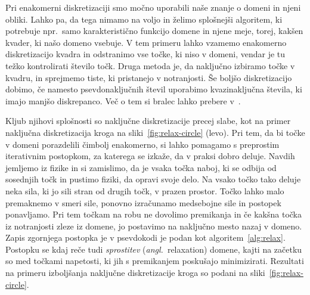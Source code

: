 \documentclass[12pt,a4paper]{article}
\theoremstyle{definition} %
\theoremstyle{plain} %
\numberwithin{equation}{section}
\newcommand{\ang}[1]{(\textit{angl.}\ #1)}
\begin{document}
Pri enakomerni diskretizaciji smo močno uporabili naše znanje o domeni in njeni
obliki. Lahko pa, da tega nimamo na voljo in želimo splošnejši algoritem, ki
potrebuje npr.~samo karakteristično funkcijo domene in njene meje, torej, kakšen
kvader, ki našo domeno vsebuje.
V tem primeru lahko vzamemo enakomerno diskretizacijo kvadra in odstranimo vse
točke, ki niso v domeni, vendar je tu težko kontrolirati število točk.
Druga metoda je, da naključno izbiramo točke v kvadru, in sprejmemo tiste, ki
pristanejo v notranjosti. Še boljšo diskretizacijo dobimo, če namesto
psevdonaključnih števil uporabimo kvazinaključna števila, ki imajo manjšo
diskrepanco. Več o tem si bralec lahko prebere v~\cite{morokoff1994quasi}.

Kljub njihovi splošnosti so naključne diskretizacije precej slabe, kot na primer
naključna diskretizacija kroga na sliki~\ref{fig:relax-circle} (levo).
Pri tem, da bi točke v domeni porazdelili čimbolj enakomerno, si lahko pomagamo
s preprostim iterativnim postopkom, za katerega se izkaže, da v praksi dobro
deluje. Navdih jemljemo iz fizike in si zamislimo, da je vsaka točka naboj, ki
se odbija od sosednjih točk in pustimo fiziki, da opravi svoje delo.
Na vsako točko tako deluje neka sila, ki jo sili
stran od drugih točk, v prazen prostor. Točko lahko malo premaknemo v smeri
sile, ponovno izračunamo medsebojne sile in postopek ponavljamo. Pri tem točkam
na robu ne dovolimo premikanja in če kakšna točka iz notranjosti zleze iz
domene, jo postavimo na naključno mesto nazaj v domeno. Zapis zgornjega postopka
je v psevdokodi je podan kot algoritem~\ref{alg:relax}. Postopku se kdaj reče
tudi \emph{sprostitev} \ang{relaxation} domene, kajti na začetku so med točkami
napetosti, ki jih s premikanjem poskušajo minimizirati. Rezultati na primeru
izboljšanja naključne diskretizacije kroga so podani na
sliki~\ref{fig:relax-circle}.
\end{document}

